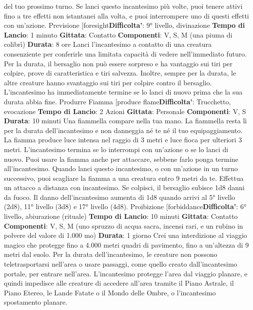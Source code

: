 \begin{multicols}{2}
del tuo prossimo turno.
Se lanci questo incantesimo più volte, puoi tenere attivi
fino a tre effetti non istantanei alla volta, e puoi
interrompere uno di questi effetti con un’azione.
Previsione
[foresight\textbf{Difficolta'}:
9° livello, divinazione
\textbf{Tempo di Lancio}: 1 minuto
\textbf{Gittata}: Contatto
\textbf{Componenti}: V, S, M (una piuma di colibrì)
\textbf{Durata}: 8 ore
Lanci l’incantesimo a contatto di una creatura
consenziente per conferirle una limitata capacità di
vedere nell’immediato futuro. Per la durata, il bersaglio
non può essere sorpreso e ha vantaggio sui tiri per
colpire, prove di caratteristica e tiri salvezza. Inoltre,
sempre per la durata, le altre creature hanno
svantaggio sui tiri per colpire contro il bersaglio.
L’incantesimo ha immediatamente termine se lo lanci di
nuovo prima che la sua durata abbia fine.
Produrre Fiamma
[produce flame\textbf{Difficolta'}:
Trucchetto, evocazione
\textbf{Tempo di Lancio}: 2 Azioni
\textbf{Gittata}: Personale
\textbf{Componenti}: V, S
\textbf{Durata}: 10 minuti
Una fiammella compare nella tua mano. La fiammella
resta lì per la durata dell’incantesimo e non danneggia
né te né il tuo equipaggiamento. La fiamma produce
luce intensa nel raggio di 3 metri e luce fioca per
ulteriori 3 metri. L’incantesimo termina se lo interrompi
con un’azione o se lo lanci di nuovo.
Puoi usare la fiamma anche per attaccare, sebbene
farlo ponga termine all’incantesimo. Quando lanci
questo incantesimo, o con un’azione in un turno
successivo, puoi scagliare la fiamma a una creatura
entro 9 metri da te. Effettua un attacco a distanza con
incantesimo. Se colpisci, il bersaglio subisce 1d8 danni
da fuoco.
Il danno dell’incantesimo aumenta di 1d8 quando arrivi
al 5° livello (2d8), 11° livello (3d8) e 17° livello (4d8).
Proibizione
[forbiddance\textbf{Difficolta'}:
6° livello, abiurazione (rituale)
\textbf{Tempo di Lancio}: 10 minuti
\textbf{Gittata}: Contatto
\textbf{Componenti}: V, S, M (uno spruzzo di acqua sacra,
incensi rari, e un rubino in polvere del valore di 1.000
mo)
\textbf{Durata}: 1 giorno
Crei una interdizione al viaggio magico che protegge
fino a 4.000 metri quadri di pavimento, fino a un’altezza
di 9 metri dal suolo. Per la durata dell’incantesimo, le
creature non possono teletrasportarsi nell’area o usare
passaggi, come quello creato dall’incantesimo portale,
per entrare nell’area. L’incantesimo protegge l’area dal
viaggio planare, e quindi impedisce alle creature di
accedere all’area tramite il Piano Astrale, il Piano
Etereo, le Lande Fatate o il Mondo delle Ombre, o
l’incantesimo spostamento planare.

\end{multicols}
